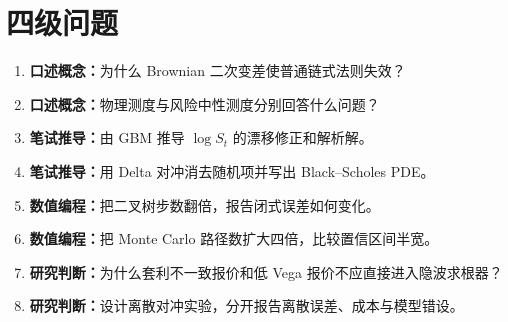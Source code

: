 \section{四级问题}
\begin{enumerate}[leftmargin=*]
  \item \textbf{口述概念：}为什么 Brownian 二次变差使普通链式法则失效？
  \item \textbf{口述概念：}物理测度与风险中性测度分别回答什么问题？
  \item \textbf{笔试推导：}由 GBM 推导 $\log S_t$ 的漂移修正和解析解。
  \item \textbf{笔试推导：}用 Delta 对冲消去随机项并写出 Black--Scholes PDE。
  \item \textbf{数值编程：}把二叉树步数翻倍，报告闭式误差如何变化。
  \item \textbf{数值编程：}把 Monte Carlo 路径数扩大四倍，比较置信区间半宽。
  \item \textbf{研究判断：}为什么套利不一致报价和低 Vega 报价不应直接进入隐波求根器？
  \item \textbf{研究判断：}设计离散对冲实验，分开报告离散误差、成本与模型错设。
\end{enumerate}
